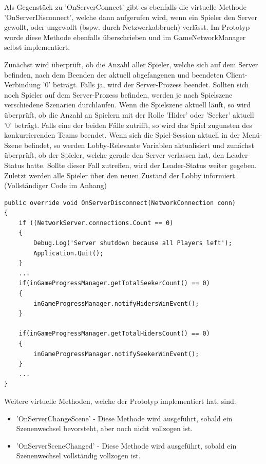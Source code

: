 Als Gegenstück zu 'OnServerConnect' gibt es ebenfalls die virtuelle Methode 'OnServerDisconnect', welche dann aufgerufen wird, wenn ein Spieler den Server gewollt, oder ungewollt (bspw. durch Netzwerkabbruch) verlässt. Im Prototyp wurde diese Methode ebenfalls überschrieben und im GameNetworkManager selbst implementiert. 

Zunächst wird überprüft, ob die Anzahl aller Spieler, welche sich auf dem Server befinden, nach dem Beenden der aktuell abgefangenen und beendeten Client-Verbindung '0' beträgt. Falls ja, wird der Server-Prozess beendet. Sollten sich noch Spieler auf dem Server-Prozess befinden, werden je nach Spielszene verschiedene Szenarien durchlaufen. Wenn die Spielszene aktuell läuft, so wird überprüft, ob die Anzahl an Spielern mit der Rolle 'Hider' oder 'Seeker' aktuell '0' beträgt. Falls eine der beiden Fälle zutrifft, so wird das Spiel zugunsten des konkurrierenden Teams beendet. Wenn sich die Spiel-Session aktuell in der Menü-Szene befindet, so werden Lobby-Relevante Variablen aktualisiert und zunächst überprüft, ob der Spieler, welche gerade den Server verlassen hat, den Leader-Status hatte. Sollte dieser Fall zutreffen, wird der Leader-Status weiter gegeben. Zuletzt werden alle Spieler über den neuen Zustand der Lobby informiert. (Vollständiger Code im Anhang)

\begin{lstlisting}[caption= GameNetworkManager.cs OnServerDisconnect()]
public override void OnServerDisconnect(NetworkConnection conn)
{
	if ((NetworkServer.connections.Count == 0)
	{
		Debug.Log('Server shutdown because all Players left');
		Application.Quit();
	}
	...
	if(inGameProgressManager.getTotalSeekerCount() == 0)
	{
		inGameProgressManager.notifyHidersWinEvent();
	}

	if(inGameProgressManager.getTotalHidersCount() == 0)
	{
		inGameProgressManager.notifySeekerWinEvent();
	}
	...
}
\end{lstlisting}

Weitere virtuelle Methoden, welche der Prototyp implementiert hat, sind:

\begin{itemize}
	\item 'OnServerChangeScene' - Diese Methode wird ausgeführt, sobald ein Szenenwechsel bevorsteht, aber noch nicht vollzogen ist.
	\item 'OnServerSceneChanged' - Diese Methode wird ausgeführt, sobald ein Szenenwechsel vollständig vollzogen ist.
\end{itemize}

